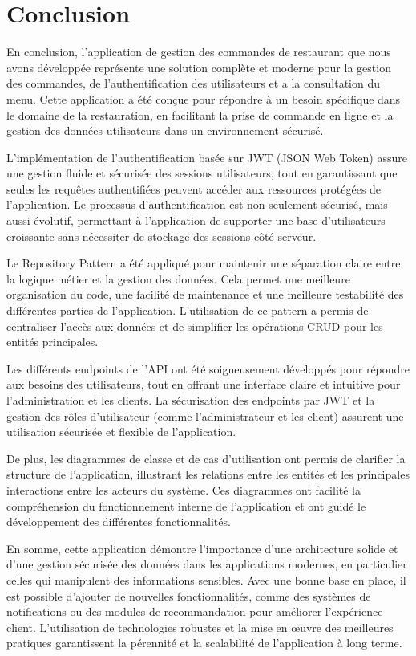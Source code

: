 
\section*{Conclusion}

En conclusion, l'application de gestion des commandes de restaurant que nous avons développée représente une solution complète et moderne pour la gestion des commandes, de l'authentification des utilisateurs et a la consultation du menu. Cette application a été conçue pour répondre à un besoin spécifique dans le domaine de la restauration, en facilitant la prise de commande en ligne et la gestion des données utilisateurs dans un environnement sécurisé.

L'implémentation de l'authentification basée sur JWT (JSON Web Token) assure une gestion fluide et sécurisée des sessions utilisateurs, tout en garantissant que seules les requêtes authentifiées peuvent accéder aux ressources protégées de l'application. Le processus d'authentification est non seulement sécurisé, mais aussi évolutif, permettant à l'application de supporter une base d'utilisateurs croissante sans nécessiter de stockage des sessions côté serveur.

Le Repository Pattern a été appliqué pour maintenir une séparation claire entre la logique métier et la gestion des données. Cela permet une meilleure organisation du code, une facilité de maintenance et une meilleure testabilité des différentes parties de l'application. L'utilisation de ce pattern a permis de centraliser l'accès aux données et de simplifier les opérations CRUD pour les entités principales.

Les différents endpoints de l'API ont été soigneusement développés pour répondre aux besoins des utilisateurs, tout en offrant une interface claire et intuitive pour l'administration et les clients. La sécurisation des endpoints par JWT et la gestion des rôles d'utilisateur (comme l'administrateur et les client) assurent une utilisation sécurisée et flexible de l'application.

De plus, les diagrammes de classe et de cas d'utilisation ont permis de clarifier la structure de l'application, illustrant les relations entre les entités et les principales interactions entre les acteurs du système. Ces diagrammes ont facilité la compréhension du fonctionnement interne de l'application et ont guidé le développement des différentes fonctionnalités.

En somme, cette application démontre l'importance d'une architecture solide et d'une gestion sécurisée des données dans les applications modernes, en particulier celles qui manipulent des informations sensibles. Avec une bonne base en place, il est possible d'ajouter de nouvelles fonctionnalités, comme des systèmes de notifications ou des modules de recommandation pour améliorer l'expérience client. L'utilisation de technologies robustes et la mise en œuvre des meilleures pratiques garantissent la pérennité et la scalabilité de l'application à long terme.
